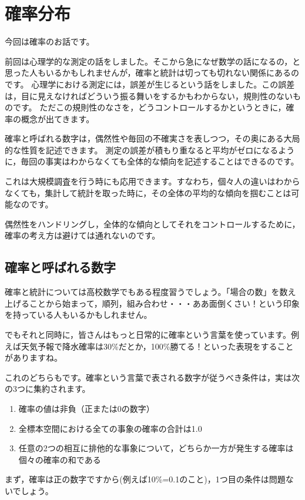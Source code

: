 \documentclass{ltjbook}
\begin{document}
 
\chapter{確率分布} 
\label{chapter7} 
今回は確率のお話です。

前回は心理学的な測定の話をしました。そこから急になぜ数学の話になるの，と思った人もいるかもしれませんが，確率と統計は切っても切れない関係にあるのです。
心理学における測定には，誤差が生じるという話をしました。この誤差は，目に見えなければどういう振る舞いをするかもわからない，規則性のないものです。
ただこの規則性のなさを，どうコントロールするかというときに，確率の概念が出てきます。

確率と呼ばれる数字は，偶然性や毎回の不確実さを表しつつ，その奥にある大局的な性質を記述できます。
測定の誤差が積もり重なると平均がゼロになるように，毎回の事実はわからなくても全体的な傾向を記述することはできるのです。

これは大規模調査を行う時にも応用できます。すなわち，個々人の違いはわからなくても，集計して統計を取った時に，その全体の平均的な傾向を掴むことは可能なのです。

偶然性をハンドリングし，全体的な傾向としてそれをコントロールするために，確率の考え方は避けては通れないのです。

\section{確率と呼ばれる数字}
確率と統計については高校数学でもある程度習うでしょう。「場合の数」を数え上げることから始まって，順列，組み合わせ・・・ああ面倒くさい！という印象を持っている人もいるかもしれません。

でもそれと同時に，皆さんはもっと日常的に確率という言葉を使っています。例えば天気予報で降水確率は30\%だとか，100\%勝てる！といった表現をすることがありますね。

これのどちらもです。確率という言葉で表される数字が従うべき条件は，実は次の3つに集約されます。
\begin{enumerate}
    \item 確率の値は非負（正または0の数字）
    \item 全標本空間における全ての事象の確率の合計は1.0
    \item 任意の2つの相互に排他的な事象について，どちらか一方が発生する確率は個々の確率の和である
\end{enumerate}

まず，確率は正の数字ですから(例えば10\%=0.1のこと)，1つ目の条件は問題ないでしょう。
\end{document}
